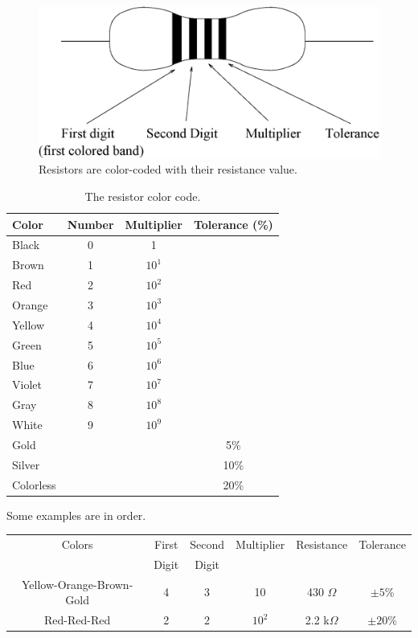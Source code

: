 \begin{figure}[!htb]
\centering \epsfxsize=9cm \includegraphics[scale=0.4]{2_dc/resistor.eps}
\caption{Resistors are color-coded with their resistance value.}
\label{fig:DC:colorcode}
\end{figure}
\begin{table}[htb]
\begin{center}
\begin{tabular}{|l|c|c|c|}
\hline
Color & Number & Multiplier & Tolerance (\%) \\
\hline
Black     & 0 & 1      &      \\
Brown     & 1 & $10^1$ &      \\
Red       & 2 & $10^2$ &      \\
Orange    & 3 & $10^3$ &      \\
Yellow    & 4 & $10^4$ &      \\
Green     & 5 & $10^5$ &      \\
Blue      & 6 & $10^6$ &      \\
Violet    & 7 & $10^7$ &      \\
Gray      & 8 & $10^8$ &      \\
White     & 9 & $10^9$ &      \\
Gold      &   &        & 5\%  \\
Silver    &   &        & 10\% \\
Colorless &   &        & 20\% \\
\hline
\end{tabular}
\end{center}
\caption{The resistor color code.}
\label{tab:DC:colorcode}
\end{table}

Some examples are in order.\\
\begin{tabular}{cccccc}
Colors & First & Second & Multiplier & Resistance & Tolerance \\
& Digit & Digit & & & \\
Yellow-Orange-Brown-Gold & 4 & 3 & 10 & 430  $\Omega$ & $\pm 5$\%  \\
Red-Red-Red   & 2 & 2 & $10^2$ & 2.2 k$\Omega$ & $\pm 20$\% 
\end{tabular}


